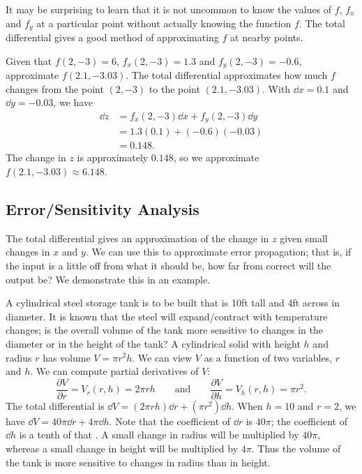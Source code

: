 It may be surprising to learn that it is not uncommon to know the values of $f$, $f_x$ and $f_y$ at a particular point without actually knowing the function $f$. The total differential gives a good method of approximating $f$ at nearby points.

\begin{example}\label{ex_totaldiff3}
Given that $f(2,-3) = 6$, $f_x(2,-3) = 1.3$ and $f_y(2,-3) = -0.6$, approximate $f(2.1,-3.03)$.
\solution
The total differential approximates how much $f$ changes from the point $(2,-3)$ to the point $(2.1,-3.03)$. With $\dd x = 0.1$ and $\dd y = -0.03$, we have
\begin{align*}
\dd z &= f_x(2,-3)\dd x + f_y(2,-3)\dd y\\
		&= 1.3(0.1) + (-0.6)(-0.03) \\
		&= 0.148.
\end{align*}
The change in $z$ is approximately $0.148$, so we approximate $f(2.1,-3.03)\approx 6.148$.
\end{example}

\subsection{Error/Sensitivity Analysis}

The total differential gives an approximation of the change in $z$ given small changes in $x$ and $y$. We can use this to approximate error propagation; that is, if the input is a little off from what it should be, how far from correct will the output be? We demonstrate this in an example.

\begin{example}\label{ex_totaldiff4}
A cylindrical steel storage tank is to be built that is 10ft tall and 4ft across in diameter. It is known that the steel will expand/contract with temperature changes; is the overall volume of the tank more sensitive to changes in the diameter or in the height of the tank?
\solution
A cylindrical solid with height $h$ and radius $r$ has volume $V = \pi r^2h$. We can view $V$ as a function of two variables, $r$ and $h$. We can compute partial derivatives of $V$:
\[\frac{\partial V}{\partial r} = V_r(r,h) = 2\pi rh \qquad \text{and}\qquad \frac{\partial V}{\partial h} = V_h(r,h) = \pi r^2.\]
The total differential is $\dd V = (2\pi rh)\dd r + (\pi r^2)\dd h.$ When $h = 10$ and $r = 2$, we have $\dd V = 40\pi \dd r + 4\pi \dd h$.
Note that the coefficient of $\dd r$ is $40\pi%
$; the coefficient of $\dd h$ is a tenth of that%
. A small change in radius will be multiplied by $40\pi$, whereas a small change in height will be multiplied by $4\pi$. Thus the volume of the tank is more sensitive to changes in radius than in height.
\end{example}

